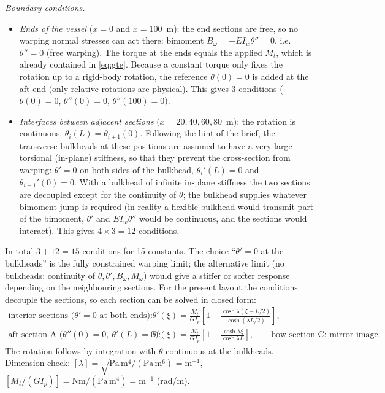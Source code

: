 \emph{Boundary conditions.}
\begin{itemize}
  \item \emph{Ends of the vessel} ($x=0$ and $x=100$~m): the end sections are free, so no warping normal stresses can act there: bimoment $B_\omega=-EI_w\theta''=0$, i.e.\ $\theta''=0$ (free warping). The torque at the ends equals the applied $M_t$, which is already contained in \eqref{eq:gte}. Because a constant torque only fixes the rotation up to a rigid-body rotation, the reference $\theta(0)=0$ is added at the aft end (only relative rotations are physical). This gives 3 conditions ($\theta(0)=0$, $\theta''(0)=0$, $\theta''(100)=0$).
  \item \emph{Interfaces between adjacent sections} ($x=20,40,60,80$~m): the rotation is continuous, $\theta_i(L)=\theta_{i+1}(0)$. Following the hint of the brief, the transverse bulkheads at these positions are assumed to have a very large torsional (in-plane) stiffness, so that they prevent the cross-section from warping: $\theta'=0$ on both sides of the bulkhead, $\theta_i'(L)=0$ and $\theta_{i+1}'(0)=0$. With a bulkhead of infinite in-plane stiffness the two sections are decoupled except for the continuity of $\theta$; the bulkhead supplies whatever bimoment jump is required (in reality a flexible bulkhead would transmit part of the bimoment, $\theta'$ and $EI_w\theta''$ would be continuous, and the sections would interact). This gives $4\times3=12$ conditions.
\end{itemize}
In total $3+12=15$ conditions for 15 constants. The choice ``$\theta'=0$ at the bulkheads'' is the fully constrained warping limit; the alternative limit (no bulkheads: continuity of $\theta,\theta',B_\omega,M_\omega$) would give a stiffer or softer response depending on the neighbouring sections. For the present layout the conditions decouple the sections, so each section can be solved in closed form:
\begin{align}
  \text{interior sections (}\theta'=0\text{ at both ends):}\quad &\theta'(\xi)=\frac{M_t}{GI_p}\left[1-\frac{\cosh\lambda(\xi-L/2)}{\cosh(\lambda L/2)}\right],\\
  \text{aft section A (}\theta''(0)=0,\ \theta'(L)=0\text{):}\quad &\theta'(\xi)=\frac{M_t}{GI_p}\left[1-\frac{\cosh\lambda\xi}{\cosh\lambda L}\right],\qquad
  \text{bow section C: mirror image.}
\end{align}
The rotation follows by integration with $\theta$ continuous at the bulkheads. Dimension check: $[\lambda]=\sqrt{\mathrm{Pa\,m^4/(Pa\,m^6)}}=\mathrm{m^{-1}}$, $[M_t/(GI_p)]=\mathrm{Nm/(Pa\,m^4)}=\mathrm{m^{-1}}$ (rad/m).

